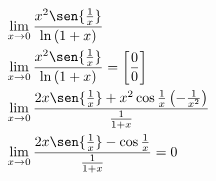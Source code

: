 \begin{ex}
\begin{align}
&\lim_{x\rightarrow 0} \frac{x^2\sen{\frac{1}{x}}}{\ln{(1+x)}}\nonumber\\
&\lim_{x\rightarrow 0} \frac{x^2\sen{\frac{1}{x}}}{\ln{(1+x)}} = \left[\frac{0}{0}\right]\nonumber\\
&\lim_{x\rightarrow 0} \frac{2x\sen{\frac{1}{x}}+x^2\cos{\frac{1}{x}}\left(-\frac{1}{x^2}\right)}{\frac{1}{1+x}}\nonumber\\
&\lim_{x\rightarrow 0} \frac{2x\sen{\frac{1}{x}}-\cos{\frac{1}{x}}}{\frac{1}{1+x}}=0\nonumber
\end{align}
\end{ex}
